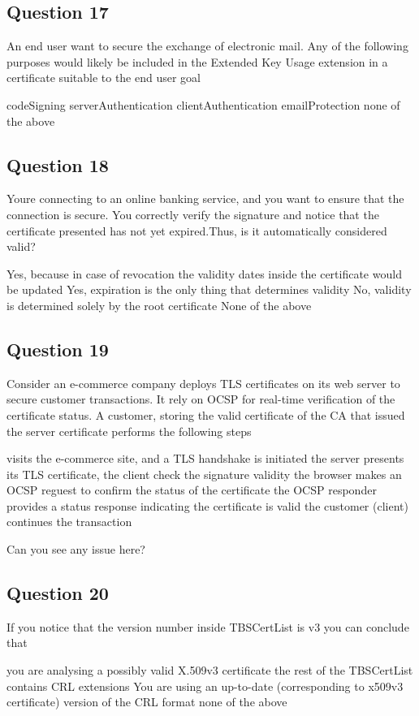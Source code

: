 \subsection*{Question 17}
An end user want to secure the exchange of electronic mail. Any of the following purposes would likely be included in the Extended Key Usage extension in a certificate suitable to the end user goal
\begin{itemize}
  \incorrect codeSigning
  \incorrect serverAuthentication 
  \incorrect clientAuthentication 
  \correct emailProtection 
  \incorrect none of the above
\end{itemize}
\subsection*{Question 18}
Youre connecting to an online banking service, and you want to ensure that the
connection is secure. You correctly verify the signature and notice that the
certificate presented has not yet expired.Thus, is it automatically considered
valid?
\begin{itemize}
  \incorrect Yes, because in case of revocation the validity dates inside the
  certificate would be updated
  \incorrect Yes, expiration is the only thing that determines validity 
  \incorrect No, validity is determined solely by the root certificate 
  \correct None of the above
\end{itemize}
\subsection*{Question 19}
Consider an e-commerce company deploys TLS certificates on its web server to
secure customer transactions. It rely on OCSP for real-time verification of the
certificate status. A customer, storing the valid certificate of the CA that
issued the server certificate performs the following steps
\begin{itemize}
  \correct visits the e-commerce site, and a TLS handshake is initiated
  \incorrect the server presents its TLS certificate, the client check the
  signature validity
  \incorrect the browser makes an OCSP reguest to confirm the status of the
  certificate
  \incorrect the OCSP responder provides a status response indicating the
  certificate is valid
  \correct the customer (client) continues the transaction
\end{itemize}
Can you see any issue here?
\subsection*{Question 20}
If you notice that the version number inside TBSCertList is v3 you can conclude that
\begin{itemize}
  \incorrect you are analysing a possibly valid X.509v3 certificate 
  \incorrect the rest of the TBSCertList contains CRL extensions
  \incorrect You are using an up-to-date (corresponding to x509v3 certificate) version of the CRL format
  \correct none of the above
\end{itemize}

